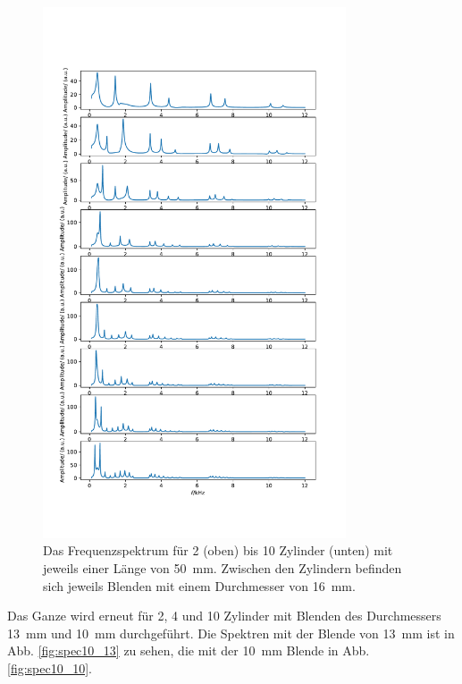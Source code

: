 \begin{figure}
    \centering
    \includegraphics[width=0.8\textwidth]{plots/B_1.pdf}
    \caption{Das Frequenzspektrum für \num{2} (oben) bis \num{10} Zylinder (unten) mit jeweils einer Länge von \SI{50}{\milli\metre}. Zwischen den Zylindern befinden sich jeweils Blenden mit einem Durchmesser von \SI{16}{\milli\metre}.}
    \label{fig:spec10}
\end{figure}

Das Ganze wird erneut für \num{2}, \num{4} und \num{10} Zylinder mit Blenden des Durchmessers \SI{13}{\milli\meter} und \SI{10}{\milli\meter} durchgeführt. Die Spektren mit der Blende von \SI{13}{\milli\meter} ist in Abb. \ref{fig:spec10_13} zu sehen, die mit der \SI{10}{\milli\meter} Blende in Abb. \ref{fig:spec10_10}. 

